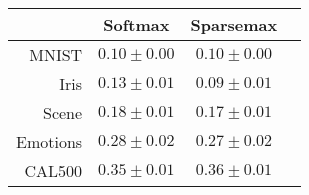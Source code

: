 \begin{tabular}{r|ccc}
& Softmax & Sparsemax \\
\hline
MNIST & $0.10 \pm 0.00$ & $0.10 \pm 0.00$ \\
Iris & $0.13 \pm 0.01$ & $0.09 \pm 0.01$ \\
Scene & $0.18 \pm 0.01$ & $0.17 \pm 0.01$ \\
Emotions & $0.28 \pm 0.02$ & $0.27 \pm 0.02$ \\
CAL500 & $0.35 \pm 0.01$ & $0.36 \pm 0.01$ \\
\end{tabular}
